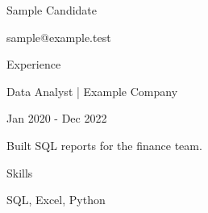\documentclass[11pt]{article}
\begin{document}
Sample Candidate\par
sample@example.test\par
Experience\par
Data Analyst | Example Company\par
Jan 2020 - Dec 2022\par
Built SQL reports for the finance team.\par
Skills\par
SQL, Excel, Python\par
\end{document}
